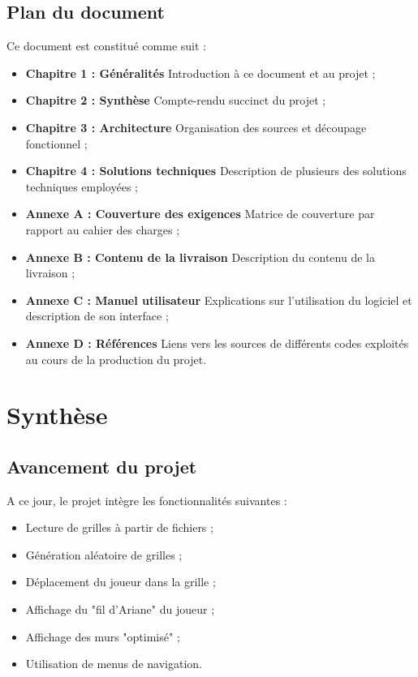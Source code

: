 \documentclass{book}
\begin{document}
\section{Plan du document}

Ce document est constitué comme suit :
\begin{itemize}
	\item \textbf{Chapitre 1 : Généralités} Introduction à ce document et au projet ;
	\item \textbf{Chapitre 2 : Synthèse} Compte-rendu succinct du projet ;
	\item \textbf{Chapitre 3 : Architecture} Organisation des sources et découpage fonctionnel ;
	\item \textbf{Chapitre 4 : Solutions techniques} Description de plusieurs des solutions techniques employées ;
	\item \textbf{Annexe A : Couverture des exigences} Matrice de couverture par rapport au cahier des charges ;
	\item \textbf{Annexe B : Contenu de la livraison} Description du contenu de la livraison ;
	\item \textbf{Annexe C : Manuel utilisateur} Explications sur l'utilisation du logiciel et description de son interface ;
	\item \textbf{Annexe D : Références} Liens vers les sources de différents codes exploités au cours de la production du projet.
\end{itemize}


\chapter{Synthèse}

\section{Avancement du projet}

A ce jour, le projet intègre les fonctionnalités suivantes :
\begin{itemize}
	\item Lecture de grilles à partir de fichiers ;
	\item Génération aléatoire de grilles ;
	\item Déplacement du joueur dans la grille ;
	\item Affichage du "fil d'Ariane" du joueur ;
	\item Affichage des murs "optimisé" ;
	\item Utilisation de menus de navigation.
\end{itemize}
\end{document}
